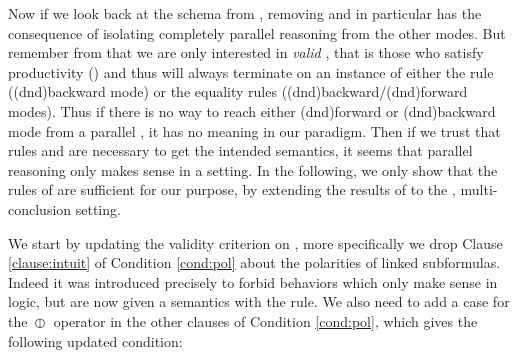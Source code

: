 Now if we look back at the schema from , removing
{} and {} in particular has the consequence
of isolating completely parallel reasoning from the other modes. But remember
from  that we are only interested in \emph{valid} , that
is those  who satisfy productivity () and thus will
always terminate on an instance of either the {} rule (\kl(dnd){backward} mode)
or the equality rules (\kl(dnd){backward}/\kl(dnd){forward} modes). Thus if there is no way to reach
either \kl(dnd){forward} or \kl(dnd){backward} mode from a parallel , it has no meaning in
our paradigm. Then if we trust that rules {} and
{} are necessary to get the intended semantics, it seems that
parallel reasoning only makes sense in a  setting. In the following, we
only show that the rules of  are sufficient for our purpose, by
extending the results of  to the , multi-conclusion setting.

We start by updating the validity criterion on , more specifically we
drop Clause \ref{clause:intuit} of Condition \ref{cond:pol} about the polarities
of linked subformulas. Indeed it was introduced precisely to forbid behaviors
which only make sense in  logic, but are now given a semantics with the
{} rule. We also need to add a case for the $\operatorname{\,\varobar\,}$ operator
in the other clauses of Condition \ref{cond:pol}, which gives the following
updated condition:

